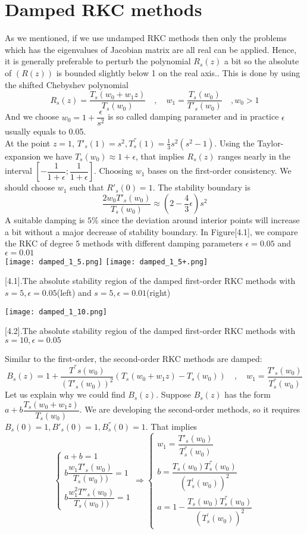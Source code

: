 \documentclass{article}
\theoremstyle{theorem}
\theoremstyle{definition}
\begin{document}
	\section{Damped RKC methods}
	As we mentioned, if we use undamped RKC methods then only the problems which has the eigenvalues of Jacobian matrix are all real can be applied. Hence, it is  generally preferable to perturb the polynomial $R_s(z)$ a bit so the absolute of $(R(z))$ is bounded slightly below 1 on the real axis.. This is done by using the shifted Chebyshev polynomial
	$$R_s(z)=\frac{T_s(w_0+w_1z)}{T_s(w_0)} \quad , \quad w_1=\frac{T_s(w_0)}{T'_s(w_0)} \quad , w_0>1$$
	And we choose $w_0=1+\dfrac{\epsilon}{s^2}$ is so called damping parameter and in practice $\epsilon$ usually equals to 0.05. \\
	At the point $z=1$, $T'_s(1)=s^2, T^{''}_s(1)=\frac{1}{3}s^2(s^2-1)$. Using the Taylor-expansion we have $T_s(w_0) \approx 1+ \epsilon$, that implies $R_s(z)$ ranges nearly in the interval $\left[-\dfrac{1}{1+\epsilon};\dfrac{1}{1+\epsilon}\right]$. Choosing $w_1$ bases on the first-order consistency. We should choose $w_1$ such that $R'_s(0)=1$. The stability boundary is $$\frac{2w_0T'_s(w_0)}{T_s(w_0)} \approx \left(2-\frac{4}{3} \epsilon\right)s^2$$
	A suitable damping is $5 \%$ since the deviation around interior points will increase a bit without  a major decrease of stability boundary. In Figure[4.1], we compare the RKC of degree $5$ methods with different damping parameters $\epsilon=0.05$ and $\epsilon=0.01$    \\
		\texttt{[image: damped\_1\_5.png]}	
	\texttt{[image: damped\_1\_5+.png]}
		\begin{center}
			\figurename[4.1]{.The absolute stability region of the damped first-order RKC methods with $s=5, \epsilon =0.05$(left) and $s=5, \epsilon=0.01$(right)}
		\end{center}	
	\begin{center}
		\texttt{[image: damped\_1\_10.png]}
	\end{center}
	\begin{center}
			\figurename[4.2]{.The absolute stability region of the damped first-order RKC methods with $s=10, \epsilon =0.05$}
	\end{center}
Similar to the first-order, the second-order RKC methods are damped:
	$$B_s(z)=1+\frac{T^{''}s(w_0)}{(T'_s(w_0))^2}(T_s(w_0+w_1z)-T_s(w_0)) \quad, \quad w_1=\frac{T'_s(w_0)}{T^{''}_s(w_0)}$$
Let us explain why we could find $B_s(z)$. Suppose $B_s(z)$ has the form $a+b\dfrac{T_s(w_0+w_1z)}{T_s(w_0)}$. We are developing the second-order methods, so it requires $B_s(0)=1, B'_s(0)=1, B^{''}_s(0)=1$. That implies $$\left\{\begin{matrix}
a+b=1\\ 
b\dfrac{w_1T'_s(w_0)}{T_s(w_0))}=1\\ 
b\dfrac{w_1^2 T''_s(w_0)}{T_s(w_0))}=1
\end{matrix}\right. \Rightarrow  \left\{\begin{matrix}
w_1=\dfrac{T'_s(w_0)}{T^{''}_s(w_0)}\\ 
b=\dfrac{T_s(w_0)T^{''}_s(w_0)}{(T^{'}_s(w_0))^2}\\ 
a=1-\dfrac{T_s(w_0)T^{''}_s(w_0)}{(T^{'}_s(w_0))^2}
\end{matrix}\right.$$
\end{document}
